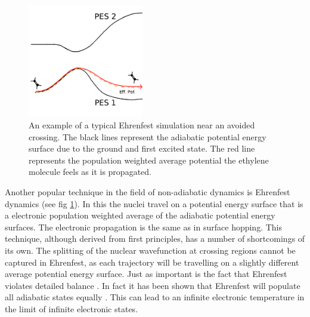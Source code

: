\newpage
\begin{figure}
  \includegraphics[width=0.45\textwidth]{./img/Eh_hop.png}
  \caption{\label{fig:Eh_diag}An example of a typical Ehrenfest simulation near an avoided crossing. The black lines represent the adiabatic potential energy surface due to the ground and first excited state. The red line represents the population weighted average potential the ethylene molecule feels as it is propagated.}
\end{figure}
\noindent Another popular technique in the field of non-adiabatic dynamics is Ehrenfest dynamics (see fig \ref{fig:Eh_diag}). In this the nuclei travel on a potential energy surface that is a electronic population weighted average of the adiabatic potential energy surfaces. The electronic propagation is the same as in surface hopping. This technique, although derived from first principles, has a number of shortcomings of its own. The splitting of the nuclear wavefunction at crossing regions cannot be captured in Ehrenfest, as each trajectory will be travelling on a slightly different average potential energy surface. Just as important is the fact that Ehrenfest violates detailed balance \cite{tully_perspective:_2012, john_c._tully_nonadiabatic_nodate}. In fact it has been shown that Ehrenfest will populate all adiabatic states
equally \cite{parandekar_detailed_2006}. This can lead to an infinite electronic temperature in the limit of infinite electronic states.

